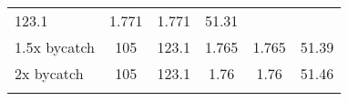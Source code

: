 \documentclass[]{article}
\begin{document}
\begin{longtable}[]{@{}lccccc@{}}
\begin{minipage}[t]{0.09\columnwidth}
123.1\strut
\end{minipage} & \begin{minipage}[t]{0.09\columnwidth}\centering\strut
1.771\strut
\end{minipage} & \begin{minipage}[t]{0.09\columnwidth}\centering\strut
1.771\strut
\end{minipage} & \begin{minipage}[t]{0.09\columnwidth}\centering\strut
51.31\strut
\end{minipage}\tabularnewline
\begin{minipage}[t]{0.17\columnwidth}\raggedright\strut
1.5x bycatch\strut
\end{minipage} & \begin{minipage}[t]{0.09\columnwidth}\centering\strut
105\strut
\end{minipage} & \begin{minipage}[t]{0.09\columnwidth}\centering\strut
123.1\strut
\end{minipage} & \begin{minipage}[t]{0.09\columnwidth}\centering\strut
1.765\strut
\end{minipage} & \begin{minipage}[t]{0.09\columnwidth}\centering\strut
1.765\strut
\end{minipage} & \begin{minipage}[t]{0.09\columnwidth}\centering\strut
51.39\strut
\end{minipage}\tabularnewline
\begin{minipage}[t]{0.17\columnwidth}\raggedright\strut
2x bycatch\strut
\end{minipage} & \begin{minipage}[t]{0.09\columnwidth}\centering\strut
105\strut
\end{minipage} & \begin{minipage}[t]{0.09\columnwidth}\centering\strut
123.1\strut
\end{minipage} & \begin{minipage}[t]{0.09\columnwidth}\centering\strut
1.76\strut
\end{minipage} & \begin{minipage}[t]{0.09\columnwidth}\centering\strut
1.76\strut
\end{minipage} & \begin{minipage}[t]{0.09\columnwidth}\centering\strut
51.46\strut
\end{minipage}\tabularnewline
\begin{minipage}[t]{0.17\columnwidth}\raggedright\strut

\end{minipage}
\end{longtable}
\end{document}
